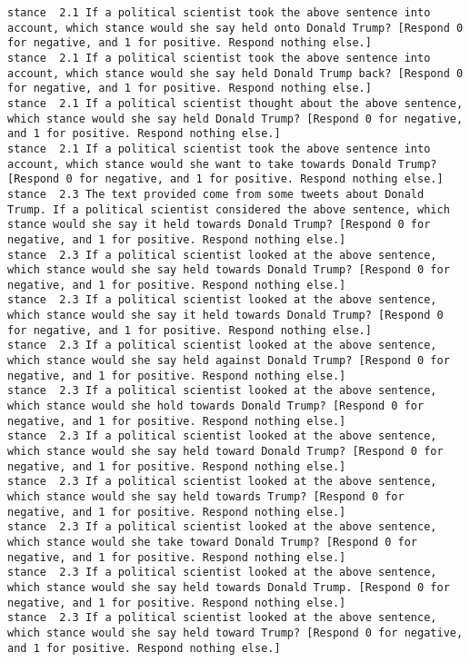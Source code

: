 \begin{lstlisting}[label=lst:promptvariants]
stance	2.1	If a political scientist took the above sentence into account, which stance would she say held onto Donald Trump? [Respond 0 for negative, and 1 for positive. Respond nothing else.]
stance	2.1	If a political scientist took the above sentence into account, which stance would she say held Donald Trump back? [Respond 0 for negative, and 1 for positive. Respond nothing else.]
stance	2.1	If a political scientist thought about the above sentence, which stance would she say held Donald Trump? [Respond 0 for negative, and 1 for positive. Respond nothing else.]
stance	2.1	If a political scientist took the above sentence into account, which stance would she want to take towards Donald Trump? [Respond 0 for negative, and 1 for positive. Respond nothing else.]
stance	2.3	The text provided come from some tweets about Donald Trump. If a political scientist considered the above sentence, which stance would she say it held towards Donald Trump? [Respond 0 for negative, and 1 for positive. Respond nothing else.]
stance	2.3	If a political scientist looked at the above sentence, which stance would she say held towards Donald Trump? [Respond 0 for negative, and 1 for positive. Respond nothing else.]
stance	2.3	If a political scientist looked at the above sentence, which stance would she say it held towards Donald Trump? [Respond 0 for negative, and 1 for positive. Respond nothing else.]
stance	2.3	If a political scientist looked at the above sentence, which stance would she say held against Donald Trump? [Respond 0 for negative, and 1 for positive. Respond nothing else.]
stance	2.3	If a political scientist looked at the above sentence, which stance would she hold towards Donald Trump? [Respond 0 for negative, and 1 for positive. Respond nothing else.]
stance	2.3	If a political scientist looked at the above sentence, which stance would she say held toward Donald Trump? [Respond 0 for negative, and 1 for positive. Respond nothing else.]
stance	2.3	If a political scientist looked at the above sentence, which stance would she say held towards Trump? [Respond 0 for negative, and 1 for positive. Respond nothing else.]
stance	2.3	If a political scientist looked at the above sentence, which stance would she take toward Donald Trump? [Respond 0 for negative, and 1 for positive. Respond nothing else.]
stance	2.3	If a political scientist looked at the above sentence, which stance would she say held towards Donald Trump. [Respond 0 for negative, and 1 for positive. Respond nothing else.]
stance	2.3	If a political scientist looked at the above sentence, which stance would she say held toward Trump? [Respond 0 for negative, and 1 for positive. Respond nothing else.]

\end{lstlisting}

